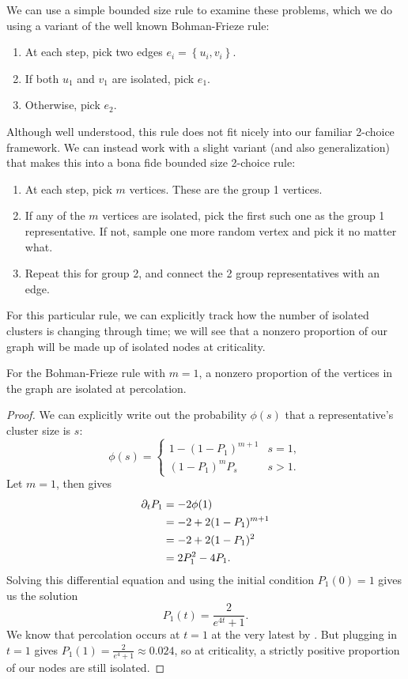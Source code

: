 \documentclass[twoside,10pt]{article}
\newcommand{\BF}{Bohman-Frieze\xspace}
\begin{document}
We can use a simple bounded size rule to examine these problems, which we do using a variant of the well known \BF rule:
\begin{enumerate}
        \item At each step, pick two edges $e_i = \left\{ u_i, v_i \right\}$.
        \item If both $u_1$ and $v_1$ are isolated, pick $e_1$.
        \item Otherwise, pick $e_2$.
\end{enumerate}
Although well understood, this rule does not fit nicely into our familiar 2-choice framework. We can instead work with a slight variant (and also generalization) that makes this into a bona fide bounded size 2-choice rule:
\begin{enumerate}
        \item At each step, pick $m$ vertices. These are the group 1 vertices.         \item If any of the $m$ vertices are isolated, pick the first such one as the group 1 representative. If not, sample one more random vertex and pick it no matter what.
        \item Repeat this for group 2, and connect the 2 group representatives with an edge.
\end{enumerate}
For this particular rule, we can explicitly track how the number of isolated clusters is changing through time; we will see that a nonzero proportion of our graph will be made up of isolated nodes at criticality.
\begin{prop}[]
	\label{nonzero-at-criticality}
	For the \BF rule with $m=1$, a nonzero proportion of the vertices in the graph are isolated at percolation.
\end{prop}
\begin{proof}
 We can explicitly write out the probability $\phi(s)$ that a representative's cluster size is $s$:
\[
        \phi(s)=
        \begin{cases}
                1 - (1-P_1)^{m+1} & s = 1, \\
                (1-P_1)^{m}P_s & s > 1.
        \end{cases}
\]
Let $m=1$, then  gives
\begin{align*}
	\partial_{t}{P_1} &= -2 \phi(1) \\
                    &= -2 + 2(1-P_1)^{m+1} \\
                    &= -2 + 2(1-P_1)^{2} \\
                    &= 2P_1^{2} - 4P_1.
\end{align*}
Solving this differential equation and using the initial condition $P_1(0)=1$ gives us the solution
\[
        P_1(t) = \frac{2}{e^{4t}+1} .
\]
We know that percolation occurs at $t=1$ at the very latest by \cite{RW-cont}. But plugging in $t=1$ gives $P_1(1) = \frac{2}{e^{4}+1} \approx 0.024$, so at criticality, a strictly positive proportion of our nodes are still isolated.
\end{proof}
\end{document}
